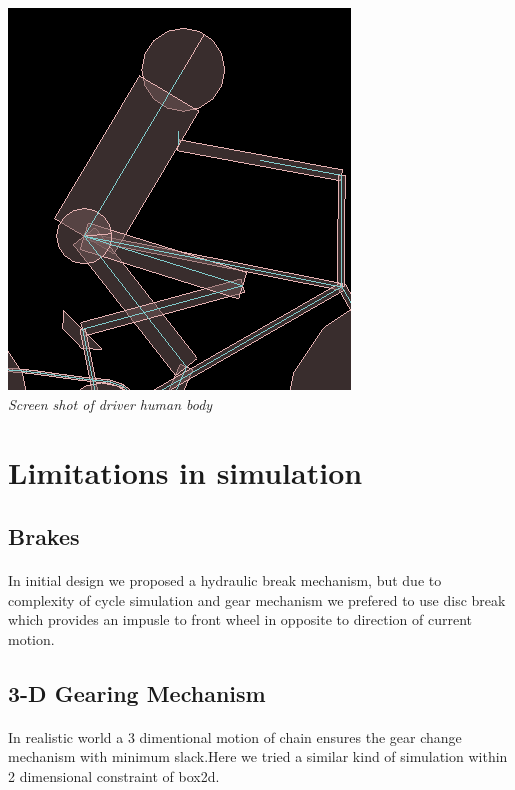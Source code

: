 \documentclass[11pt]{article}
\begin{document}
	\begin{center}
	 \includegraphics[scale = 0.4]{images/body} \\
	  \emph{Screen shot of driver human body} \\
	\end{center}

\section{Limitations in simulation}
\subsection{Brakes}
\paragraph{}
	In initial design we proposed a hydraulic break mechanism, but due to complexity of cycle simulation and gear mechanism we prefered  
	to use disc break which provides an impusle to front wheel in opposite to direction of current motion.
	
 \subsection{3-D Gearing Mechanism}
 \paragraph{}
	In realistic world a 3 dimentional motion of chain ensures the gear change mechanism with minimum slack.Here we tried a similar 
	kind of simulation within 2 dimensional constraint of box2d.
\end{document}

